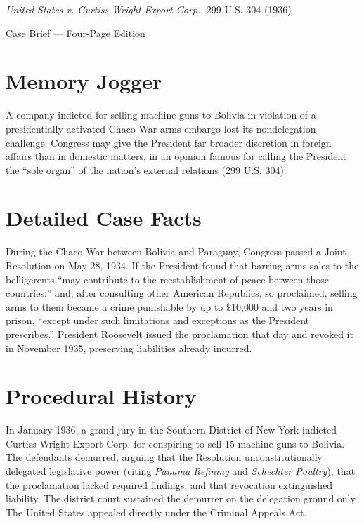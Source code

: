 \documentclass[12pt]{article}
\begin{document}
\begin{center}
{\LARGE \textit{United States v. Curtiss-Wright Export Corp.}, 299 U.S. 304 (1936)\par}
\vspace{0.8em}
{\large Case Brief --- Four-Page Edition\par}
\end{center}
\vspace{1em}

\section{Memory Jogger}

A company indicted for selling machine guns to Bolivia in violation of a presidentially activated Chaco War arms embargo lost its nondelegation challenge: Congress may give the President far broader discretion in foreign affairs than in domestic matters, in an opinion famous for calling the President the ``sole organ'' of the nation's external relations (\href{https://supreme.justia.com/cases/federal/us/299/304/}{299 U.S. 304}).

\section{Detailed Case Facts}

During the Chaco War between Bolivia and Paraguay, Congress passed a Joint Resolution on May 28, 1934. If the President found that barring arms sales to the belligerents ``may contribute to the reestablishment of peace between those countries,'' and, after consulting other American Republics, so proclaimed, selling arms to them became a crime punishable by up to \$10,000 and two years in prison, ``except under such limitations and exceptions as the President prescribes.'' President Roosevelt issued the proclamation that day and revoked it in November 1935, preserving liabilities already incurred.

\section{Procedural History}

In January 1936, a grand jury in the Southern District of New York indicted Curtiss-Wright Export Corp. for conspiring to sell 15 machine guns to Bolivia. The defendants demurred, arguing that the Resolution unconstitutionally delegated legislative power (citing \textit{Panama Refining} and \textit{Schechter Poultry}), that the proclamation lacked required findings, and that revocation extinguished liability. The district court sustained the demurrer on the delegation ground only. The United States appealed directly under the Criminal Appeals Act.
\end{document}
